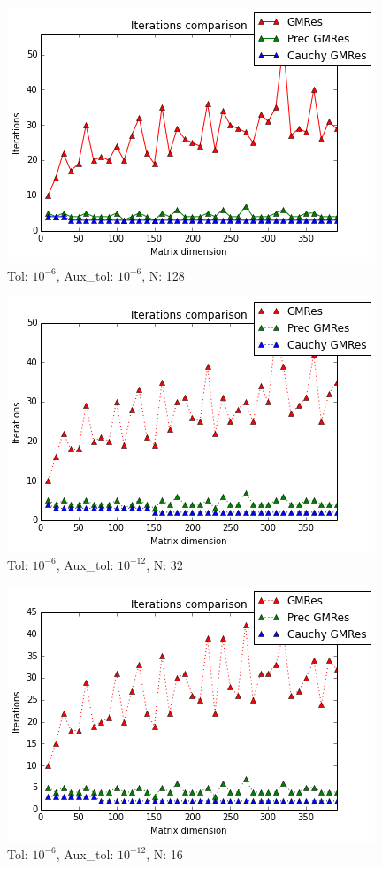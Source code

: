 \documentclass[fleqn]{article}
\begin{document}
\begin{figure}[ht]
    \centering
    \includegraphics[scale=0.4]{images/i1.png}
    \caption{Tol: $10^{-6}$, Aux\_tol: $10^{-6}$, N: 128}
    \label{fig:1}
\end{figure}

\begin{figure}[ht]
    \centering
    \includegraphics[scale=0.4]{images/i2.png}
    \caption{Tol: $10^{-6}$, Aux\_tol: $10^{-12}$, N: 32   }
    \label{fig:2}
\end{figure}
\newpage
\begin{figure}[ht]
    \centering
    \includegraphics[scale=0.4]{images/i3.png}
    \caption{Tol: $10^{-6}$, Aux\_tol: $10^{-12}$, N: 16}
    \label{fig:3}
\end{figure}
\end{document}
